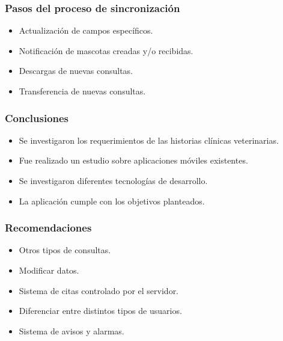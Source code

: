 \documentclass[14pt]{beamer}
\begin{document}
\begin{frame}
\frametitle{Pasos del proceso de sincronización}
\begin{itemize}
\item Actualización de campos específicos.
\item Notificación de mascotas creadas y/o recibidas.
\item Descargas de nuevas consultas.
\item Transferencia de nuevas consultas.
\end{itemize}
\end{frame}


\begin{frame}
\frametitle{Conclusiones}
\begin{itemize}
\item[\checkmark] Se investigaron los requerimientos de las historias clínicas veterinarias.
\item[\checkmark] Fue realizado un estudio sobre aplicaciones móviles existentes.
\item[\checkmark] Se investigaron diferentes tecnologías de desarrollo.
\item[\checkmark] La aplicación cumple con los objetivos planteados.
\end{itemize}
\end{frame}



\begin{frame}
\frametitle{Recomendaciones}

\begin{itemize}
\item Otros tipos de consultas.
\item Modificar datos.
\item Sistema de citas controlado por el servidor.
\item Diferenciar entre distintos tipos de usuarios.
\item Sistema de avisos y alarmas.
\end{itemize}

\end{frame}





\begin{frame}
\maketitle
\end{frame}
\end{document}
